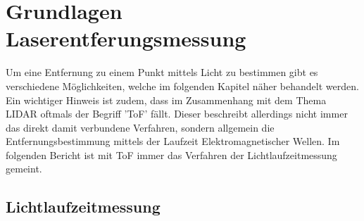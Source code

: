\chapter{Grundlagen Laserentferungsmessung}\label{chap:grund_lidar}
Um eine Entfernung zu einem Punkt mittels Licht zu bestimmen gibt es verschiedene Möglichkeiten, welche im folgenden Kapitel näher behandelt werden. Ein wichtiger Hinweis ist zudem, dass im Zusammenhang mit dem Thema \ac{LIDAR} oftmals der Begriff '\acf{ToF}' fällt. Dieser beschreibt allerdings nicht immer das direkt damit verbundene Verfahren, sondern allgemein die Entfernungsbestimmung mittels der Laufzeit Elektromagnetischer Wellen. Im folgenden Bericht ist mit \ac{ToF} immer das Verfahren der Lichtlaufzeitmessung gemeint.  
\section{Lichtlaufzeitmessung}
